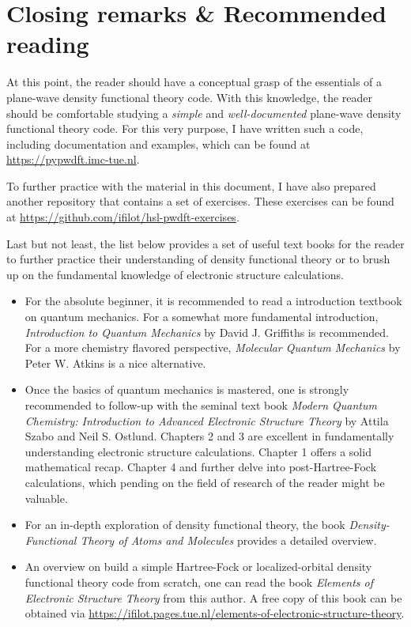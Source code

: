 %
%
%
\section{Closing remarks \& Recommended reading}
\label{chap:further_reading}

At this point, the reader should have a conceptual grasp of the essentials of a plane-wave density functional theory code. With this knowledge, the reader should be comfortable studying a \textit{simple} and \textit{well-documented} plane-wave density functional theory code. For this very purpose, I have written such a code, including documentation and examples, which can be found at \url{https://pypwdft.imc-tue.nl}. 

To further practice with the material in this document, I have also prepared another repository that contains a set of exercises. These exercises can be found at \url{https://github.com/ifilot/hsl-pwdft-exercises}.

Last but not least, the list below provides a set of useful text books for the reader to further practice their understanding of density functional theory or to brush up on the fundamental knowledge of electronic structure calculations.

\begin{itemize}
    \item For the absolute beginner, it is recommended to read a introduction textbook on quantum mechanics. For a somewhat more fundamental introduction, \textit{Introduction to Quantum Mechanics}\cite{2004:griffiths} by David J. Griffiths is recommended. For a more chemistry flavored perspective, \textit{Molecular Quantum Mechanics}\cite{2011:atkins} by Peter W. Atkins is a nice alternative.
    
    \item Once the basics of quantum mechanics is mastered, one is strongly recommended to follow-up with the seminal text book \textit{Modern Quantum Chemistry: Introduction to Advanced Electronic Structure Theory}\cite{szabo} by Attila Szabo and Neil S. Ostlund. Chapters 2 and 3 are excellent in fundamentally understanding electronic structure calculations. Chapter 1 offers a solid mathematical recap. Chapter 4 and further delve into post-Hartree-Fock calculations, which pending on the field of research of the reader might be valuable.

    \item For an in-depth exploration of density functional theory, the book \textit{Density-Functional Theory of Atoms and Molecules}\cite{1994:parr} provides a detailed overview.

    \item An overview on build a simple Hartree-Fock or localized-orbital density functional theory code from scratch, one can read the book \textit{Elements of Electronic Structure Theory} from this author. A free copy of this book can be obtained via \url{https://ifilot.pages.tue.nl/elements-of-electronic-structure-theory}.
    
\end{itemize}